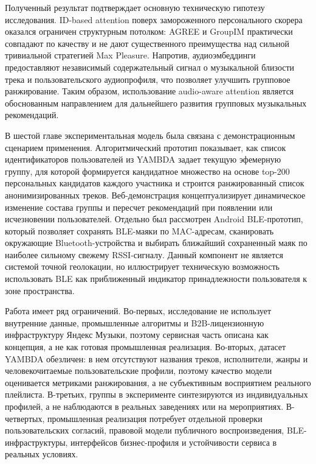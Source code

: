 Полученный результат подтверждает основную техническую гипотезу исследования. ID-based attention поверх замороженного персонального скорера оказался ограничен структурным потолком: AGREE и GroupIM практически совпадают по качеству и не дают существенного преимущества над сильной тривиальной стратегией Max Pleasure. Напротив, аудиоэмбеддинги предоставляют независимый содержательный сигнал о музыкальной близости трека и пользовательского аудиопрофиля, что позволяет улучшить групповое ранжирование. Таким образом, использование audio-aware attention является обоснованным направлением для дальнейшего развития групповых музыкальных рекомендаций.

В шестой главе экспериментальная модель была связана с демонстрационным сценарием применения. Алгоритмический прототип показывает, как список идентификаторов пользователей из YAMBDA задает текущую эфемерную группу, для которой формируется кандидатное множество на основе top-200 персональных кандидатов каждого участника и строится ранжированный список анонимизированных треков. Веб-демонстрация концептуализирует динамическое изменение состава группы и пересчет рекомендаций при появлении или исчезновении пользователей. Отдельно был рассмотрен Android BLE-прототип, который позволяет сохранять BLE-маяки по MAC-адресам, сканировать окружающие Bluetooth-устройства и выбирать ближайший сохраненный маяк по наиболее сильному свежему RSSI-сигналу. Данный компонент не является системой точной геолокации, но иллюстрирует техническую возможность использовать BLE как приближенный индикатор принадлежности пользователя к зоне пространства.

Работа имеет ряд ограничений. Во-первых, исследование не использует внутренние данные, промышленные алгоритмы и B2B-лицензионную инфраструктуру Яндекс Музыки, поэтому сервисная часть описана как концепция, а не как готовая промышленная реализация. Во-вторых, датасет YAMBDA обезличен: в нем отсутствуют названия треков, исполнители, жанры и человекочитаемые пользовательские профили, поэтому качество модели оценивается метриками ранжирования, а не субъективным восприятием реального плейлиста. В-третьих, группы в эксперименте синтезируются из индивидуальных профилей, а не наблюдаются в реальных заведениях или на мероприятиях. В-четвертых, промышленная реализация потребует отдельной проверки пользовательских согласий, правовой модели публичного воспроизведения, BLE-инфраструктуры, интерфейсов бизнес-профиля и устойчивости сервиса в реальных условиях.

